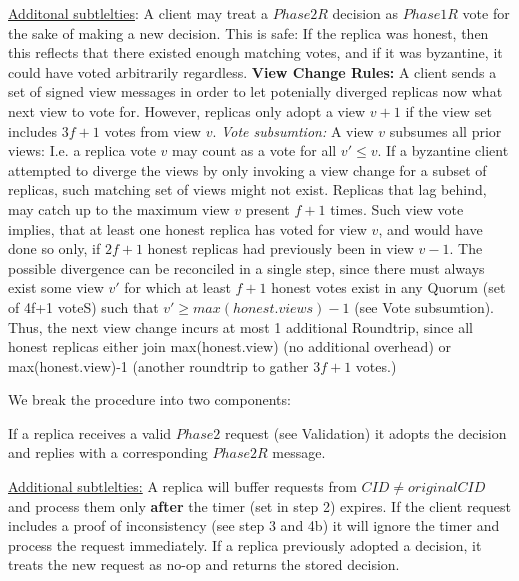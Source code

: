 \underline{Additonal subtlelties}: A client may treat a $Phase2R$ decision as $Phase1R$ vote for the sake of making a new decision. This is safe: If the replica was honest, then this reflects that there existed enough matching votes, and if it was byzantine, it could have voted arbitrarily regardless. 
 \textbf{View Change Rules:} A client sends a set of signed view messages in order to let potenially diverged replicas now what next view to vote for. However, replicas only adopt a view $v+1$ if the view set includes $3f+1$  votes from view $v$. \textit{Vote subsumtion:} A view $v$ subsumes all prior views: I.e. a replica vote $v$ may count as a vote for all $v' \leq v$. If a byzantine client attempted to diverge the views by only invoking a view change for a subset of replicas, such matching set of views might not exist. 
Replicas that lag behind, may catch up to the maximum view $v$ present $f+1$ times. Such view vote implies, that at least one honest replica has voted for view $v$, and would have done so only, if $2f+1$ honest replicas had previously been in view $v-1$. The possible divergence can be reconciled in a single step, since there must always exist some view $v'$ for which at least $f+1$ honest votes exist in any Quorum (set of 4f+1 voteS) such that $v' \geq max(honest.views) -1 $ (see Vote subsumtion). Thus, the next view change incurs at most 1 additional Roundtrip, since all honest replicas either join max(honest.view) (no additional overhead) or max(honest.view)-1 (another roundtrip to gather $3f+1$ votes.)



We break the procedure into two components:

If a replica receives a valid $Phase2$ request (see Validation) it adopts the decision and replies with a corresponding $Phase2R$ message.

\underline{Additional subtlelties:} A replica will buffer requests from $CID \neq originalCID$ and process them only \textbf{after} the timer (set in step 2) expires. If the client request includes a proof of inconsistency (see step 3 and 4b) it will ignore the timer and process the request immediately. If a replica previously adopted a decision, it treats the new request as no-op and returns the stored decision.


